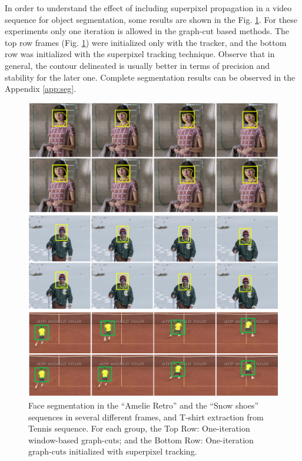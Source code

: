 In order to understand the effect of including superpixel propagation in a video sequence for object
segmentation, some results are shown in the Fig. \ref{figurelabel_comp}. For these experiments only one iteration is
allowed in the graph-cut based methods. The top row frames (Fig. \ref{figurelabel_comp}) were initialized only with the tracker, 
and the bottom row was initialized with the superpixel tracking technique. 
Observe that in general, the contour delineated is usually better in terms of precision and
stability for the later one. Complete segmentation results can be observed in the Appendix \ref{app:seg}.

   \begin{figure}[thp]
      \centering
      \includegraphics[width=1.0\textwidth]{../images/compareSegm.png}
      \caption{Face segmentation in the “Amelie Retro” and the
	      “Snow shoes” sequences in several different frames, and T-shirt extraction from Tennis sequence. For each
	       group, the Top Row: One-iteration window-based graph-cuts;
	       and the Bottom Row: One-iteration graph-cuts initialized with superpixel tracking.}
      \label{figurelabel_comp}
   \end{figure}
